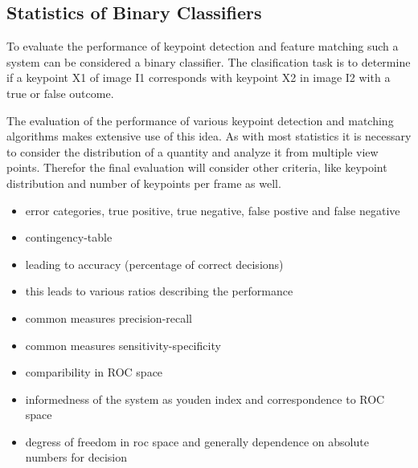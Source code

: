 \subsection{Statistics of Binary Classifiers}

To evaluate the performance of keypoint detection and feature matching such a system can be considered a binary classifier.
The clasification task is to determine if a keypoint X1 of image I1 corresponds with keypoint X2 in image I2 with a true or false outcome.

The evaluation of the performance of various keypoint detection and matching algorithms makes extensive use of this idea.
As with most statistics it is necessary to consider the distribution of a quantity and analyze it from multiple view points.
Therefor the final evaluation will consider other criteria, like keypoint distribution and number of keypoints per frame as well.

\begin{itemize}
    \item error categories, true positive, true negative, false postive and false negative
    \item contingency-table
    \item leading to accuracy (percentage of correct decisions)
    \item this leads to various ratios describing the performance 
    \item common measures precision-recall
    \item common measures sensitivity-specificity
    \item comparibility in \gls{ROC} space
    \item informedness of the system as youden index and correspondence to \gls{ROC} space
    \item degress of freedom in roc space and generally dependence on absolute numbers for decision 
\end{itemize}

